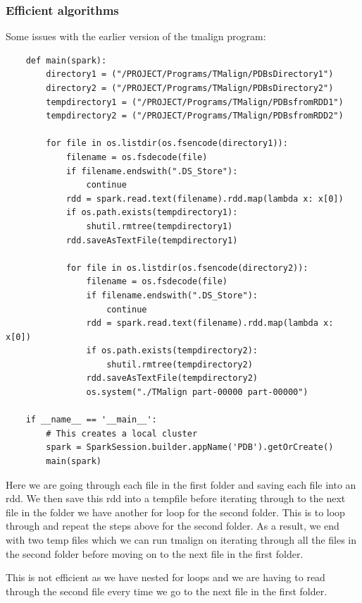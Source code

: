 \documentclass[]{final_report}
\begin{document}
\clearpage

\subsubsection{Efficient algorithms}
Some issues with the earlier version of the tmalign program:

\begin{lstlisting}
    def main(spark):
        directory1 = ("/PROJECT/Programs/TMalign/PDBsDirectory1")
        directory2 = ("/PROJECT/Programs/TMalign/PDBsDirectory2")
        tempdirectory1 = ("/PROJECT/Programs/TMalign/PDBsfromRDD1")
        tempdirectory2 = ("/PROJECT/Programs/TMalign/PDBsfromRDD2")

        for file in os.listdir(os.fsencode(directory1)):
            filename = os.fsdecode(file)
            if filename.endswith(".DS_Store"):
                continue
            rdd = spark.read.text(filename).rdd.map(lambda x: x[0])
            if os.path.exists(tempdirectory1):
                shutil.rmtree(tempdirectory1)
            rdd.saveAsTextFile(tempdirectory1)

            for file in os.listdir(os.fsencode(directory2)):
                filename = os.fsdecode(file)
                if filename.endswith(".DS_Store"):
                    continue
                rdd = spark.read.text(filename).rdd.map(lambda x: x[0])
                if os.path.exists(tempdirectory2):
                    shutil.rmtree(tempdirectory2)
                rdd.saveAsTextFile(tempdirectory2)
                os.system("./TMalign part-00000 part-00000")

    if __name__ == '__main__':
        # This creates a local cluster
        spark = SparkSession.builder.appName('PDB').getOrCreate()
        main(spark)
\end{lstlisting}

Here we are going through each file in the first folder and saving each file into an rdd. We then save this rdd into a tempfile before iterating through to the next file in the folder we have another for loop for the second folder. This is to loop through and repeat the steps above for the second folder. As a result, we end with two temp files which we can run tmalign on iterating through all the files in the second folder before moving on to the next file in the first folder.

This is not efficient as we have nested for loops and we are having to read through the second file every time we go to the next file in the first folder.
\end{document}
